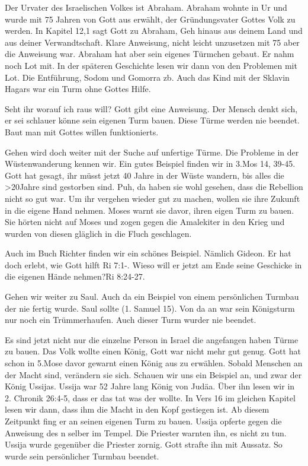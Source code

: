 \documentclass[14pt]{../../inc/mybib}
\begin{document}
    Der Urvater des Israelischen Volkes ist Abraham. Abraham wohnte in Ur und wurde mit 75 Jahren von Gott aus erwählt, der Gründungsvater Gottes Volk zu werden. In Kapitel 12,1 sagt Gott zu Abraham, \flqq Geh hinaus aus deinem Land und aus deiner Verwandtschaft.\frqq{} Klare Anweisung, nicht leicht unzusetzen mit 75 aber die Anweisung war. Abraham hat aber sein eigenes Türmchen gebaut. Er nahm noch Lot mit. In der späteren Geschichte lesen wir dann von den Problemen mit Lot. Die Entführung, Sodom und Gomorra zb. Auch das Kind mit der Sklavin Hagars war ein Turm ohne Gottes Hilfe. 
    
    Seht ihr worauf ich raus will? Gott gibt eine Anweisung. Der Mensch denkt sich, er sei schlauer könne sein eigenen Turm bauen. Diese Türme werden nie beendet. Baut man mit Gottes willen funktionierts.

    Gehen wird doch weiter mit der Suche auf unfertige Türme. Die Probleme in der Wüstenwanderung kennen wir. Ein gutes Beispiel finden wir in 3.Mos 14, 39-45. Gott hat gesagt, ihr müsst jetzt 40 Jahre in der Wüste wandern, bis alles die >20Jahre sind gestorben sind. Puh, da haben sie wohl gesehen, dass die Rebellion nicht so gut war. Um ihr vergehen wieder gut zu machen, wollen sie ihre Zukunft in die eigene Hand nehmen. Moses warnt sie davor, ihren eigen Turm zu bauen. Sie hörten nicht auf Moses und zogen gegen die Amalekiter in den Krieg und wurden von diesen gläglich in die Fluch geschlagen.

    Auch im Buch Richter finden wir ein schönes Beispiel. Nämlich Gideon. Er hat doch erlebt, wie Gott hilft Ri 7:1-. Wieso will er jetzt am Ende seine Geschicke in die eigenen Hände nehmen?Ri 8:24-27.

    Gehen wir weiter zu Saul. Auch da ein Beispiel von einem persönlichen Turmbau der nie fertig wurde. Saul sollte (1. Samuel 15). Von da an war sein Königsturm nur noch ein Trümmerhaufen. Auch dieser Turm wurder nie beendet.

    Es sind jetzt nicht nur die einzelne Person in Israel die angefangen haben Türme zu bauen. Das Volk wollte einen König, Gott war nicht mehr gut genug. Gott hat schon in 5.Mose davor gewarnt einen König aus zu erwählen. Sobald Menschen an der Macht sind, verändern sie sich. Schauen wir uns ein Beispiel an, und zwar der König Ussijas. Ussija war 52 Jahre lang König von Judäa. Über ihn lesen wir in 2. Chronik 26:4-5, dass er das tat was der \herr{} wollte. In Vers 16 im gleichen Kapitel lesen wir dann, dass ihm die Macht in den Kopf gestiegen ist. Ab diesem Zeitpunkt fing er an seinen eigenen Turm zu bauen. Ussija opferte gegen die Anweisung des \herr n selber im Tempel. Die Priester warnten ihn, es nicht zu tun. Ussija wurde gegenüber die Priester zornig. Gott strafte ihn mit Aussatz. So wurde sein persönlicher Turmbau beendet.
\end{document}
